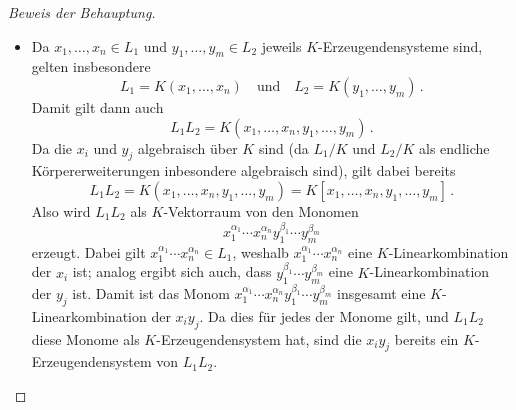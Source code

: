 \begin{proof}[Beweis der Behauptung]
\begin{itemize}
    \item
      Da $x_1, \dotsc, x_n \in L_1$ und $y_1, \dotsc, y_m \in L_2$ jeweils $K$-Erzeugendensysteme sind, gelten insbesondere
      \[
          L_1
        = K(x_1, \dotsc, x_n)
        \quad\text{und}\quad
          L_2
        = K(y_1, \dotsc, y_m) \,.
      \]
      Damit gilt dann auch
      \[
          L_1 L_2
        = K(x_1, \dotsc, x_n, y_1, \dotsc, y_m) \,.
      \]
      Da die $x_i$ und $y_j$ algebraisch über $K$ sind (da $L_1/K$ und $L_2/K$ als endliche Körpererweiterungen inbesondere algebraisch sind), gilt dabei bereits
      \[
          L_1 L_2
        = K(x_1, \dotsc, x_n, y_1, \dotsc, y_m)
        = K[x_1, \dotsc, x_n, y_1, \dotsc, y_m] \,.
      \]
      Also wird $L_1 L_2$ als $K$-Vektorraum von den Monomen
      \[
        x_1^{\alpha_1} \dotsm x_n^{\alpha_n} y_1^{\beta_1} \dotsm y_m^{\beta_m}
      \]
      erzeugt.
      Dabei gilt $x_1^{\alpha_1} \dotsm x_n^{\alpha_n} \in L_1$, weshalb $x_1^{\alpha_1} \dotsm x_n^{\alpha_n}$ eine $K$-Linear\-kombi\-nation der $x_i$ ist;
      analog ergibt sich auch, dass $y_1^{\beta_1} \dotsm y_m^{\beta_m}$ eine $K$-Linear\-kombi\-nation der $y_j$ ist.
      Damit ist das Monom $x_1^{\alpha_1} \dotsm x_n^{\alpha_n} y_1^{\beta_1} \dotsm y_m^{\beta_m}$ insgesamt eine $K$-Linear\-kombi\-nation der $x_i y_j$.
      Da dies für jedes der Monome gilt, und $L_1 L_2$ diese Monome als $K$-Erzeugendensystem hat, sind die $x_i y_j$ bereits ein $K$-Erzeugendensystem von $L_1 L_2$.
  \end{itemize}
\end{proof}












